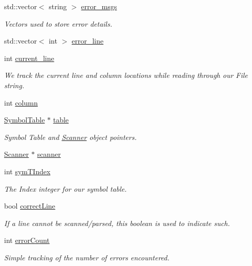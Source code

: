 \begin{DoxyCompactItemize}
\item 
std::vector$<$ string $>$ \hyperlink{classAdmin_ad8c946fbb7ed32ad1f73a24eaf422c53}{error\_\-msgs}
\begin{DoxyCompactList}\small\item\em Vectors used to store error details. \end{DoxyCompactList}\item 
std::vector$<$ int $>$ \hyperlink{classAdmin_a2070f3b7ce2f309da1b080c3d3f07ecf}{error\_\-line}
\item 
int \hyperlink{classAdmin_a77039c04350669e25d604593a77bea36}{current\_\-line}
\begin{DoxyCompactList}\small\item\em We track the current line and column locations while reading through our File string. \end{DoxyCompactList}\item 
int \hyperlink{classAdmin_ae6bcb0d3aa08b938197a332c5af5a456}{column}
\item 
\hyperlink{classSymbolTable}{SymbolTable} $\ast$ \hyperlink{classAdmin_afb5161f047f166b985257447b9c47f22}{table}
\begin{DoxyCompactList}\small\item\em Symbol Table and \hyperlink{classScanner}{Scanner} object pointers. \end{DoxyCompactList}\item 
\hyperlink{classScanner}{Scanner} $\ast$ \hyperlink{classAdmin_a6846c5ec5e565001a18a20167ff7b3cf}{scanner}
\item 
int \hyperlink{classAdmin_ae1c48226f950c3e470785785aff4d536}{symTIndex}
\begin{DoxyCompactList}\small\item\em The Index integer for our symbol table. \end{DoxyCompactList}\item 
bool \hyperlink{classAdmin_a18dd34f91c28721e9ba9ec9370ae5f98}{correctLine}
\begin{DoxyCompactList}\small\item\em If a line cannot be scanned/parsed, this boolean is used to indicate such. \end{DoxyCompactList}\item 
int \hyperlink{classAdmin_ae29edcd0464b203b35f72caba6af7295}{errorCount}
\begin{DoxyCompactList}\small\item\em Simple tracking of the number of errors encountered. \end{DoxyCompactList}\end{DoxyCompactItemize}



